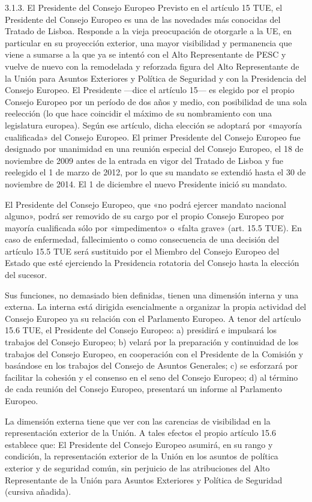 \documentclass[10pt,a4paper]{article}
\begin{document}
3.1.3. El Presidente del Consejo Europeo 
Previsto en el artículo 15 TUE, el Presidente del Consejo Europeo es una de las novedades más conocidas del Tratado de Lisboa. Responde a la vieja preocupación de otorgarle a la UE, en particular en su proyección exterior, una mayor visibilidad y permanencia que viene a sumarse a la que ya se intentó con el Alto Representante de PESC y vuelve de nuevo con la remodelada y reforzada figura del Alto Representante de la Unión para Asuntos Exteriores y Política de Seguridad y con la Presidencia del Consejo Europeo. El Presidente —dice el artículo 15— es elegido por el propio Consejo Europeo por un período de dos años y medio, con posibilidad de una sola reelección (lo que hace coincidir el máximo de su nombramiento con una legislatura europea). Según ese artículo, dicha elección se adoptará por «mayoría cualificada» del Consejo Europeo. El primer Presidente del Consejo Europeo fue designado por unanimidad en una reunión especial del Consejo Europeo, el 18 de noviembre de 2009 antes de la entrada en vigor del Tratado de Lisboa y fue reelegido el 1 de marzo de 2012, por lo que su mandato se extendió hasta el 30 de noviembre de 2014. El 1 de diciembre el nuevo Presidente inició su mandato.

El Presidente del Consejo Europeo, que «no podrá ejercer mandato nacional alguno», podrá ser removido de su cargo por el propio Consejo Europeo por mayoría cualificada sólo por «impedimento» o «falta grave» (art. 15.5 TUE). En caso de enfermedad, fallecimiento o como consecuencia de una decisión del artículo 15.5 TUE será sustituido por el Miembro del Consejo  Europeo del Estado que esté ejerciendo la Presidencia rotatoria del Consejo hasta la elección del sucesor.

Sus funciones, no demasiado bien definidas, tienen una dimensión interna y una externa. La interna está dirigida esencialmente a organizar la propia actividad del Consejo Europeo ya su relación con el Parlamento Europeo. A tenor del artículo 15.6 TUE, el Presidente del Consejo Europeo:
a) presidirá e impulsará los trabajos del Consejo Europeo;
b) velará por la preparación y continuidad de los trabajos del Consejo Europeo, en cooperación con el Presidente de la Comisión y basándose en los trabajos del Consejo de Asuntos Generales;
c) se esforzará por facilitar la cohesión y el consenso en el seno del Consejo Europeo;
d) al término de cada reunión del Consejo Europeo, presentará un informe al Parlamento Europeo.

La dimensión externa tiene que ver con las carencias de visibilidad en la representación exterior de la Unión. A tales efectos el propio artículo 15.6 establece que: El Presidente del Consejo Europeo asumirá, en su rango y condición, la representación exterior de la Unión en los asuntos de política exterior y de seguridad común, sin perjuicio de las atribuciones del Alto Representante de la Unión para Asuntos Exteriores y Política de Seguridad (cursiva añadida).
\end{document}
